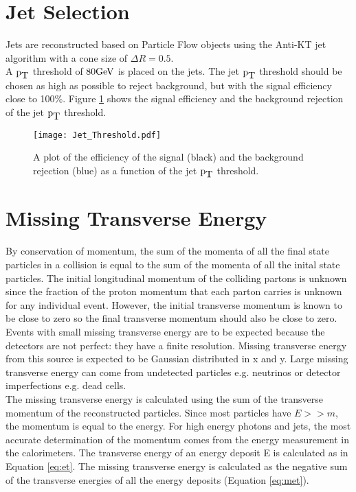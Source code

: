 \section{Jet Selection}

Jets are reconstructed based on Particle Flow objects \cite{pf} using the 
Anti-KT jet algorithm with a cone size of $\Delta R = 0.5$. \\

A $\mbox{p}_{\mbox{T}}$ threshold of $80 \mbox{GeV}$ is placed on the jets. The jet $\mbox{p}_{\mbox{T}}$ threshold 
should be chosen as high as possible to reject background, but with the signal 
efficiency close to 100\%. Figure \ref{fig:Jet_Threshold} shows the signal 
efficiency and the background rejection of the jet $\mbox{p}_{\mbox{T}}$ threshold. 

\begin{figure}
\begin{center}
\texttt{[image: Jet\_Threshold.pdf]}
\end{center}
\caption{A plot of the efficiency of the signal (black) and the background
rejection (blue) as a function of the jet $\mbox{p}_{\mbox{T}}$ threshold.}
\label{fig:Jet_Threshold}
\end{figure}

\section{Missing Transverse Energy}

By conservation of momentum, the sum of the momenta of all the final state
particles in a collision is equal to the sum of the momenta of all the inital
state particles. The initial longitudinal momentum of the colliding partons is
unknown since the fraction of the proton momentum that each parton carries is
unknown for any individual event. However, the initial transverse momentum is
known to be close to zero so the final transverse momentum should also be close
to zero. \\

Events with small missing transverse energy are to be expected because the 
detectors are not perfect: they have a finite resolution. Missing transverse
energy from this source is expected to be Gaussian distributed in x and y. Large 
missing transverse energy can come from undetected particles e.g. neutrinos or
detector imperfections e.g. dead cells. \\

The missing transverse energy is calculated using the sum of the transverse
momentum of the reconstructed particles. Since most particles have $E >> m$, the
momentum is equal to the energy. For high energy photons and jets, the most 
accurate determination of the momentum comes from the energy measurement in the
calorimeters. The transverse energy of an energy deposit E is calculated as in 
Equation \ref{eq:et}. The missing transverse energy is calculated as the
negative sum of the transverse energies of all the energy deposits (Equation
\ref{eq:met}). \\

